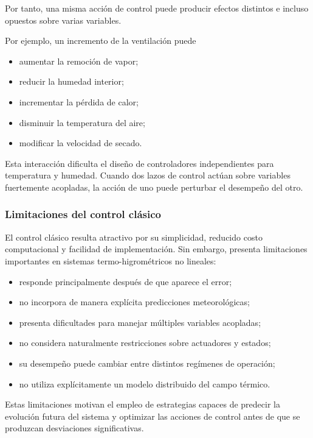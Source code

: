 Por tanto, una misma acción de control puede producir efectos distintos e incluso opuestos sobre varias variables.

Por ejemplo, un incremento de la ventilación puede

\begin{itemize}
    \item aumentar la remoción de vapor;
    \item reducir la humedad interior;
    \item incrementar la pérdida de calor;
    \item disminuir la temperatura del aire;
    \item modificar la velocidad de secado.
\end{itemize}

Esta interacción dificulta el diseño de controladores independientes para temperatura y humedad. Cuando dos lazos de control actúan sobre variables fuertemente acopladas, la acción de uno puede perturbar el desempeño del otro.

\subsubsection{Limitaciones del control clásico}

El control clásico resulta atractivo por su simplicidad, reducido costo computacional y facilidad de implementación. Sin embargo, presenta limitaciones importantes en sistemas termo-higrométricos no lineales:

\begin{itemize}
    \item responde principalmente después de que aparece el error;
    \item no incorpora de manera explícita predicciones meteorológicas;
    \item presenta dificultades para manejar múltiples variables acopladas;
    \item no considera naturalmente restricciones sobre actuadores y estados;
    \item su desempeño puede cambiar entre distintos regímenes de operación;
    \item no utiliza explícitamente un modelo distribuido del campo térmico.
\end{itemize}

Estas limitaciones motivan el empleo de estrategias capaces de predecir la evolución futura del sistema y optimizar las acciones de control antes de que se produzcan desviaciones significativas.

